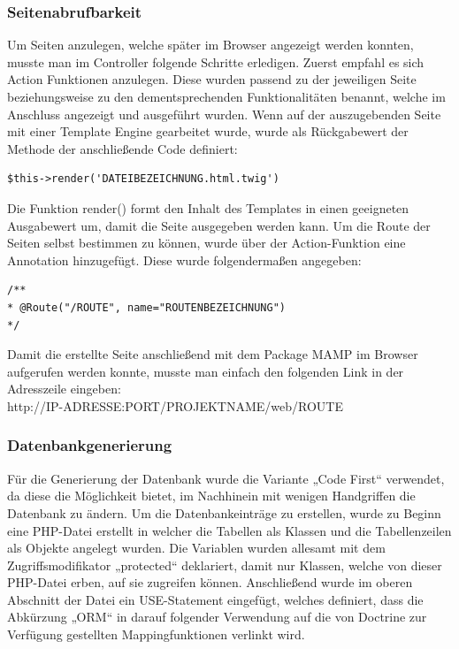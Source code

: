     \subsubsection{Seitenabrufbarkeit}

Um Seiten anzulegen, welche später im Browser angezeigt werden konnten, musste man im Controller folgende Schritte erledigen. Zuerst empfahl es sich Action Funktionen anzulegen. Diese wurden passend zu der jeweiligen Seite beziehungsweise zu den dementsprechenden Funktionalitäten benannt, welche im Anschluss angezeigt und ausgeführt wurden. Wenn auf der auszugebenden Seite mit einer Template Engine gearbeitet wurde, wurde als Rückgabewert der Methode der anschließende Code definiert:

	\lstset{language=php}
  	\begin{lstlisting}
$this->render('DATEIBEZEICHNUNG.html.twig')
  	\end{lstlisting}
Die Funktion render() formt den Inhalt des Templates in einen geeigneten Ausgabewert um, damit die Seite ausgegeben werden kann.
Um die Route der Seiten selbst bestimmen zu können, wurde über der Action-Funktion eine Annotation hinzugefügt. Diese wurde folgendermaßen angegeben:
	\lstset{language=php}
  	\begin{lstlisting}
/**
* @Route("/ROUTE", name="ROUTENBEZEICHNUNG")
*/
  	\end{lstlisting}
Damit die erstellte Seite anschließend mit dem Package MAMP im Browser aufgerufen werden konnte, musste man einfach den folgenden Link in der Adresszeile eingeben:\\
http://IP-ADRESSE:PORT/PROJEKTNAME/web/ROUTE

    \subsubsection{Datenbankgenerierung}

Für die Generierung der Datenbank wurde die Variante „Code First“ verwendet, da diese die Möglichkeit bietet, im Nachhinein mit wenigen Handgriffen die Datenbank zu ändern.
Um die Datenbankeinträge zu erstellen, wurde zu Beginn eine PHP-Datei erstellt in welcher die Tabellen als Klassen und die Tabellenzeilen als Objekte angelegt wurden. Die Variablen wurden allesamt mit dem Zugriffsmodifikator „protected“ deklariert, damit nur Klassen, welche von dieser PHP-Datei erben, auf sie zugreifen können. Anschließend wurde im oberen Abschnitt der Datei ein USE-Statement eingefügt, welches definiert, dass die Abkürzung „ORM“ in darauf folgender Verwendung auf die von Doctrine zur Verfügung gestellten Mappingfunktionen verlinkt wird.

